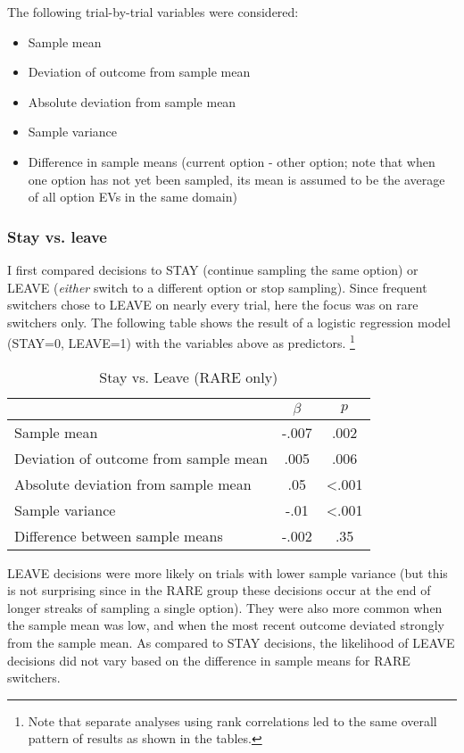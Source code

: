 \documentclass[english,doc]{apa}
\begin{document}
The following trial-by-trial variables were considered:

\begin{itemize}
\item Sample mean
\item Deviation of outcome from sample mean
\item Absolute deviation from sample mean
\item Sample variance
\item Difference in sample means (current option - other option; note that when one option has not yet been sampled, its mean is assumed to be the average of all option EVs in the same domain)
\end{itemize}


\subsubsection{Stay vs. leave}

I first compared decisions to STAY (continue sampling the same option) or LEAVE (\emph{either} switch to a different option or stop sampling).
Since frequent switchers chose to LEAVE on nearly every trial, here the focus was on rare switchers only.
The following table shows the result of a logistic regression model (STAY=0, LEAVE=1) with the variables above as predictors.
\footnote{Note that separate analyses using rank correlations led to the same overall pattern of results as shown in the tables.}


\begin{center}
\begin{table}[htdp]
\caption{Stay vs. Leave (RARE only)}
\begin{tabular}{l|c|c|}
& $\beta$ & $p$ \\
\hline
Sample mean & -.007 & .002 \\
Deviation of outcome from sample mean & .005 & .006 \\
Absolute deviation from sample mean & .05 & <.001 \\
Sample variance & -.01 & <.001 \\
Difference between sample means & -.002 & .35
\end{tabular}
\label{default}
\end{table}%
\end{center}

LEAVE decisions were more likely on trials with lower sample variance (but this is not surprising since in the RARE group these decisions occur at the end of longer streaks of sampling a single option).
They were also more common when the sample mean was low, and when the most recent outcome deviated strongly from the sample mean.
As compared to STAY decisions, the likelihood of LEAVE decisions did not vary based on the difference in sample means for RARE switchers.
\end{document}
